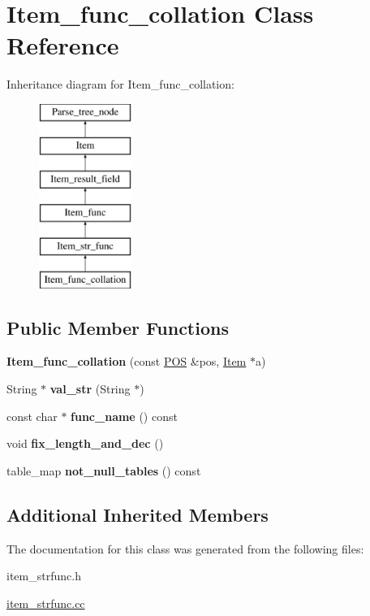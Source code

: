 \hypertarget{classItem__func__collation}{}\section{Item\+\_\+func\+\_\+collation Class Reference}
\label{classItem__func__collation}
Inheritance diagram for Item\+\_\+func\+\_\+collation\+:\begin{figure}[H]
\begin{center}
\leavevmode
\includegraphics[height=6.000000cm]{classItem__func__collation}
\end{center}
\end{figure}
\subsection*{Public Member Functions}
\begin{DoxyCompactItemize}
\item 
\mbox{\label{classItem__func__collation_aaf0596192ebac74afa4deecf21a8d307}} 
{\bfseries Item\+\_\+func\+\_\+collation} (const \mbox{\hyperlink{structYYLTYPE}{P\+OS}} \&pos, \mbox{\hyperlink{classItem}{Item}} $\ast$a)
\item 
\mbox{\label{classItem__func__collation_a7f0c9238d28cfe4e3658960752bfac1d}} 
String $\ast$ {\bfseries val\+\_\+str} (String $\ast$)
\item 
\mbox{\label{classItem__func__collation_aaece49b7000ac94d1b26fc9ea4ed4a71}} 
const char $\ast$ {\bfseries func\+\_\+name} () const
\item 
\mbox{\label{classItem__func__collation_ad58fa51d3ca8944d07e9f40d672672f4}} 
void {\bfseries fix\+\_\+length\+\_\+and\+\_\+dec} ()
\item 
\mbox{\label{classItem__func__collation_a430a65d23039990fb9b1893e8f9df4e7}} 
table\+\_\+map {\bfseries not\+\_\+null\+\_\+tables} () const
\end{DoxyCompactItemize}
\subsection*{Additional Inherited Members}


The documentation for this class was generated from the following files\+:\begin{DoxyCompactItemize}
\item 
item\+\_\+strfunc.\+h\item 
\mbox{\hyperlink{item__strfunc_8cc}{item\+\_\+strfunc.\+cc}}\end{DoxyCompactItemize}
